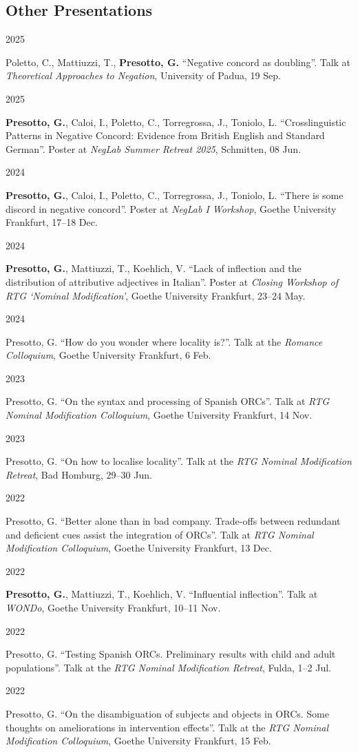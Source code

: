\documentclass[10pt,a4paper]{article}
\newlength{\yearsw}\setlength{\yearsw}{3.2cm}
\newcommand{\cvrow}[2]{%
  \noindent
  \parbox[t]{\yearsw}{\raggedright #1}%
  \hspace{0.8em}%
  \parbox[t]{\dimexpr\textwidth-\yearsw-0.8em\relax}{#2}%
  \par\vspace{2pt}%
}
\begin{document}
\subsection*{Other Presentations}

\cvrow{2025}{Poletto, C., Mattiuzzi, T., \textbf{Presotto, G.} ``Negative concord as doubling''. Talk at \textit{Theoretical Approaches to Negation}, University of Padua, 19 Sep.}


\cvrow{2025}{\textbf{Presotto, G.}, Caloi, I., Poletto, C., Torregrossa, J., Toniolo, L. ``Crosslinguistic Patterns in Negative Concord: Evidence from British English and Standard German''. Poster at \textit{NegLab Summer Retreat 2025}, Schmitten, 08 Jun.}

\cvrow{2024}{\textbf{Presotto, G.}, Caloi, I., Poletto, C., Torregrossa, J., Toniolo, L. ``There is some discord in negative concord''. Poster at \textit{NegLab I Workshop}, Goethe University Frankfurt, 17--18 Dec.}
\cvrow{2024}{\textbf{Presotto, G.}, Mattiuzzi, T., Koehlich, V. ``Lack of inflection and the distribution of attributive adjectives in Italian''. Poster at \textit{Closing Workshop of RTG `Nominal Modification'}, Goethe University Frankfurt, 23--24 May.}

\cvrow{2024}{Presotto, G. ``How do you wonder where locality is?''. Talk at the \textit{Romance Colloquium}, Goethe University Frankfurt, 6 Feb.}

\cvrow{2023}{Presotto, G. ``On the syntax and processing of Spanish ORCs''. Talk at \textit{RTG Nominal Modification Colloquium}, Goethe University Frankfurt, 14 Nov.}

\cvrow{2023}{Presotto, G. ``On how to localise locality''. Talk at the \textit{RTG Nominal Modification Retreat}, Bad Homburg, 29--30 Jun.}

\cvrow{2022}{Presotto, G. ``Better alone than in bad company. Trade-offs between redundant and deficient cues assist the integration of ORCs''. Talk at \textit{RTG Nominal Modification Colloquium}, Goethe University Frankfurt, 13 Dec.}


\cvrow{2022}{\textbf{Presotto, G.}, Mattiuzzi, T., Koehlich, V. ``Influential inflection''. Talk at \textit{WONDo}, Goethe University Frankfurt, 10--11 Nov.}

\cvrow{2022}{Presotto, G. ``Testing Spanish ORCs. Preliminary results with child and adult populations''. Talk at the \textit{RTG Nominal Modification Retreat}, Fulda, 1--2 Jul.}



\cvrow{2022}{Presotto, G. ``On the disambiguation of subjects and objects in ORCs. Some thoughts on ameliorations in intervention effects''. Talk at the \textit{RTG Nominal Modification Colloquium}, Goethe University Frankfurt, 15 Feb.}
\end{document}
